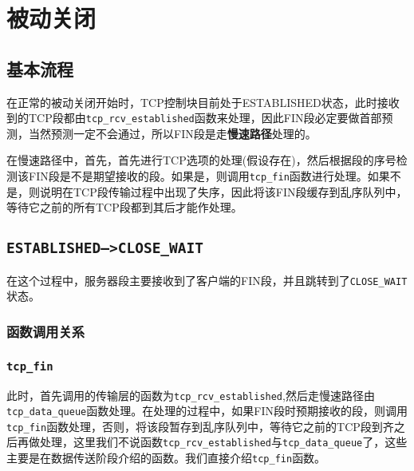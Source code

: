 \section{被动关闭}
\label{sec:passive_close}

	\subsection{基本流程}
		在正常的被动关闭开始时，TCP控制块目前处于ESTABLISHED状态，此时接收到的TCP段都由\texttt{tcp_rcv_established}函数来处理，因此FIN段必定要做首部预测，当然预测一定不会通过，所以FIN段是走\textbf{慢速路径}处理的。

		在慢速路径中，首先，首先进行TCP选项的处理(假设存在)，然后根据段的序号检测该FIN段是不是期望接收的段。如果是，则调用\texttt{tcp_fin}函数进行处理。如果不是，则说明在TCP段传输过程中出现了失序，因此将该FIN段缓存到乱序队列中，等待它之前的所有TCP段都到其后才能作处理。

	\subsection{\texttt{ESTABLISHED-->CLOSE_WAIT}}

		在这个过程中，服务器段主要接收到了客户端的FIN段，并且跳转到了\texttt{CLOSE_WAIT}状态。
		\subsubsection{函数调用关系}
		

		\subsubsection{\texttt{tcp_fin}}

			此时，首先调用的传输层的函数为\texttt{tcp_rcv_established},然后走慢速路径由\texttt{tcp_data_queue}函数处理。在处理的过程中，如果FIN段时预期接收的段，则调用\texttt{tcp_fin}函数处理，否则，将该段暂存到乱序队列中，等待它之前的TCP段到齐之后再做处理，这里我们不说函数\texttt{tcp_rcv_established}与\texttt{tcp_data_queue}了，这些主要是在数据传送阶段介绍的函数。我们直接介绍\texttt{tcp_fin}函数。


